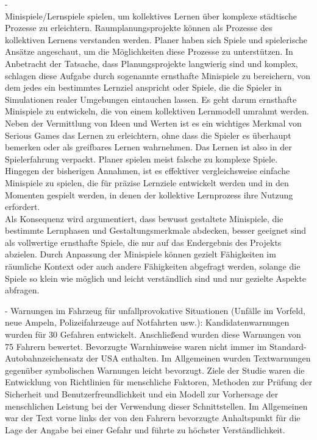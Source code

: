 -\cite{devisch2018mini}\\
Minispiele/Lernspiele spielen, um kollektives Lernen über komplexe städtische Prozesse zu erleichtern. Raumplanungsprojekte können als Prozesse des kollektiven Lernens verstanden werden. Planer haben sich Spiele und spielerische Ansätze angeschaut, um die Möglichkeiten diese Prozesse zu unterstützen. In Anbetracht der Tatsache, dass Planungsprojekte langwierig sind und komplex, schlagen diese Aufgabe durch sogenannte ernsthafte Minispiele zu bereichern, von dem jedes ein bestimmtes Lernziel anspricht oder Spiele, die die Spieler in Simulationen realer Umgebungen eintauchen lassen. Es geht darum ernsthafte Minispiele zu entwickeln, die von einem kollektiven Lernmodell umrahmt werden.\\ 
Neben der Vermittlung von Ideen und Werten ist es ein wichtiges Merkmal von Serious Games das Lernen zu erleichtern, ohne dass die Spieler es überhaupt bemerken oder als greifbares Lernen wahrnehmen. Das Lernen ist also in der Spielerfahrung verpackt. Planer spielen meist falsche zu komplexe Spiele. Hingegen der bisherigen Annahmen, ist es effektiver vergleichsweise einfache Minispiele zu spielen, die für präzise Lernziele entwickelt werden und in den Momenten gespielt werden, in denen der kollektive Lernprozess ihre Nutzung erfordert.\\
Als Konsequenz wird argumentiert, dass bewusst gestaltete Minispiele, die bestimmte Lernphasen und Gestaltungsmerkmale abdecken, besser geeignet sind als vollwertige ernsthafte Spiele, die nur auf das Endergebnis des Projekts abzielen. Durch Anpassung der Minispiele können gezielt Fähigkeiten im räumliche Kontext oder auch andere Fähigkeiten abgefragt werden, solange die Spiele so klein wie möglich und leicht verständlich sind und nur gezielte Aspekte abfragen.

-\cite{green1995driver}
Warnungen im Fahrzeug für unfallprovokative Situationen (Unfälle im Vorfeld, neue Ampeln, Polizeifahrzeuge auf Notfahrten usw.): Kandidatenwarnungen wurden für 30 Gefahren entwickelt. Anschließend wurden diese Warnungen von 75 Fahrern bewertet. Bevorzugte Warnhinweise waren nicht immer im Standard-Autobahnzeichensatz der USA enthalten. Im Allgemeinen wurden Textwarnungen gegenüber symbolischen Warnungen leicht bevorzugt. Ziele der Studie waren die Entwicklung von Richtlinien für menschliche Faktoren, Methoden zur Prüfung der Sicherheit und Benutzerfreundlichkeit und ein Modell zur Vorhersage der menschlichen Leistung bei der Verwendung dieser Schnittstellen. Im Allgemeinen war der Text vorne links der von den Fahrern bevorzugte Anhaltspunkt für die Lage der Angabe bei einer Gefahr und führte zu höchster Verständlichkeit.
